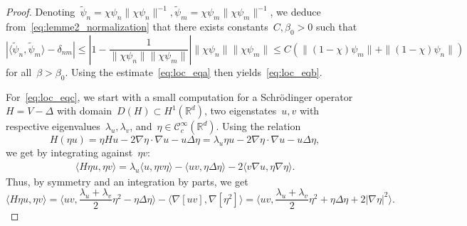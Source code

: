 \documentclass[10pt]{article}
\newcommand{\R}{\mathbb{R}}
\newcommand{\1}{\mathbbm 1}
\begin{document}
\begin{proof}
       Denoting~$\widetilde \psi_n = \chi\psi_n\|\chi\psi_n\|^{-1}, \widetilde \psi_m = \chi\psi_m\|\chi\psi_m\|^{-1}$, we deduce from~\eqref{eq:lemme2_normalization} that
       there exists constants~$C,\beta_0>0$ such that 
       \[\left|\langle \widetilde \psi_n,\widetilde \psi_m\rangle -\delta_{nm}\right|\leq \left|1-\frac{1}{\|\chi\psi_n\|\|\chi\psi_m\|}\right|\|\chi\psi_n\|\|\chi\psi_m\|\leq C(\|(1-\chi)\psi_m\| + \|(1-\chi)\psi_n\|)\]
       for all~$\beta>\beta_0$. Using the estimate~\eqref{eq:loc_eqa} then yields~\eqref{eq:loc_eqb}.

        For~\eqref{eq:loc_eqc}, we start with a small computation for a Schrödinger operator~$H = V-\Delta$ with domain~$D(H)\subset H^1(\R^d)$, two eigenstates~$u,v$ with respective eigenvalues~$\lambda_u,\lambda_v$, and~$\eta\in\mathcal C_c^\infty(\R^d)$.
        Using the relation
        \[H(\eta u) = \eta H u - 2\nabla \eta\cdot \nabla u - u \Delta \eta = \lambda_u \eta u - 2 \nabla \eta \cdot \nabla u  - u \Delta \eta,\]
        we get by integrating against~$\eta v$:
            \begin{align*}
                \langle H\eta u,\eta v\rangle = \lambda_u\langle u,\eta v\eta\rangle - \langle uv,\eta\Delta\eta\rangle -2 \langle v\nabla u,\eta\nabla\eta\rangle.
            \end{align*}
            Thus, by symmetry and an integration by parts, we get
            \begin{equation}
                \label{eq:energy_localization_formula}
                \langle H\eta u,\eta v\rangle = \langle uv,\frac{\lambda_u+\lambda_v}2\eta^2-\eta\Delta\eta\rangle -\langle \nabla[uv],\nabla[\eta^2]\rangle = \langle uv,\frac{\lambda_u+\lambda_v}2\eta^2+\eta\Delta\eta + 2|\nabla\eta|^2\rangle.
            \end{equation}
        

\end{proof}
\end{document}
